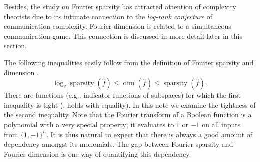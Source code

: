 \documentclass{toc}
\DeclareMathOperator{\spa}{sparsity}
\DeclareMathOperator{\dimn}{dim}
\begin{document}
Besides, the study on Fourier sparsity has attracted attention of complexity theorists due to its intimate connection to the \textit{log-rank conjecture} of communication complexity. Fourier dimension is related to a simultaneous communication game. This connection is discussed in more detail later in this section.

The following inequalities easily follow from the definition of Fourier sparsity and dimension%
.
\begin{equation}
\label{eq:order}
 \log_2 \spa(\widehat{f}) \leq \dimn(\widehat{f}) \leq \spa(\widehat{f}).
\end{equation}
There are functions (e.g., indicator functions of subspaces) for which
the first inequality is tight (\ie, %
holds with equality). In this
%
note   %
we examine the tightness of the second inequality. Note that the Fourier
transform of a Boolean function is a polynomial with a very special
%
property;     %
it evaluates to $1$ or $-1$ on all inputs from $\{1,-1\}^n$. It is thus natural to expect that there is always a good amount of dependency amongst its monomials. The gap between Fourier sparsity and Fourier dimension is one way of quantifying this dependency.
\end{document}

